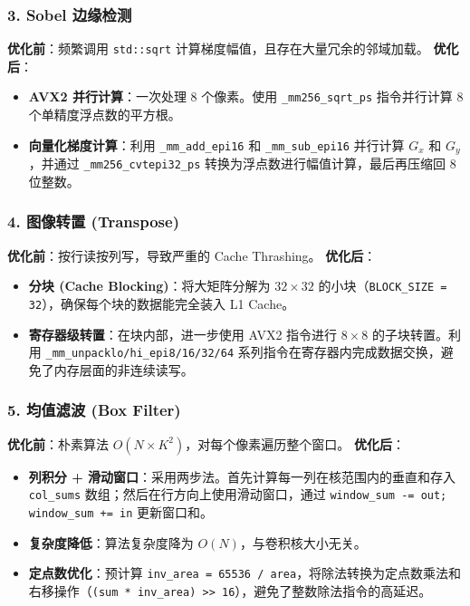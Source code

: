 \documentclass[a4paper]{article}
\begin{document}
\subsubsection{3. Sobel 边缘检测}
\textbf{优化前}：频繁调用 \texttt{std::sqrt} 计算梯度幅值，且存在大量冗余的邻域加载。
\textbf{优化后}：
\begin{itemize}
    \item \textbf{AVX2 并行计算}：一次处理 8 个像素。使用 \texttt{\_mm256\_sqrt\_ps} 指令并行计算 8 个单精度浮点数的平方根。
    \item \textbf{向量化梯度计算}：利用 \texttt{\_mm\_add\_epi16} 和 \texttt{\_mm\_sub\_epi16} 并行计算 $G_x$ 和 $G_y$，并通过 \texttt{\_mm256\_cvtepi32\_ps} 转换为浮点数进行幅值计算，最后再压缩回 8 位整数。
\end{itemize}

\subsubsection{4. 图像转置 (Transpose)}
\textbf{优化前}：按行读按列写，导致严重的 Cache Thrashing。
\textbf{优化后}：
\begin{itemize}
    \item \textbf{分块 (Cache Blocking)}：将大矩阵分解为 $32 \times 32$ 的小块（\texttt{BLOCK\_SIZE = 32}），确保每个块的数据能完全装入 L1 Cache。
    \item \textbf{寄存器级转置}：在块内部，进一步使用 AVX2 指令进行 $8 \times 8$ 的子块转置。利用 \texttt{\_mm\_unpacklo/hi\_epi8/16/32/64} 系列指令在寄存器内完成数据交换，避免了内存层面的非连续读写。
\end{itemize}

\subsubsection{5. 均值滤波 (Box Filter)}
\textbf{优化前}：朴素算法 $O(N \times K^2)$，对每个像素遍历整个窗口。
\textbf{优化后}：
\begin{itemize}
    \item \textbf{列积分 + 滑动窗口}：采用两步法。首先计算每一列在核范围内的垂直和存入 \texttt{col\_sums} 数组；然后在行方向上使用滑动窗口，通过 \texttt{window\_sum -= out; window\_sum += in} 更新窗口和。
    \item \textbf{复杂度降低}：算法复杂度降为 $O(N)$，与卷积核大小无关。
    \item \textbf{定点数优化}：预计算 \texttt{inv\_area = 65536 / area}，将除法转换为定点数乘法和右移操作（\texttt{(sum * inv\_area) >> 16}），避免了整数除法指令的高延迟。
\end{itemize}
\end{document}
